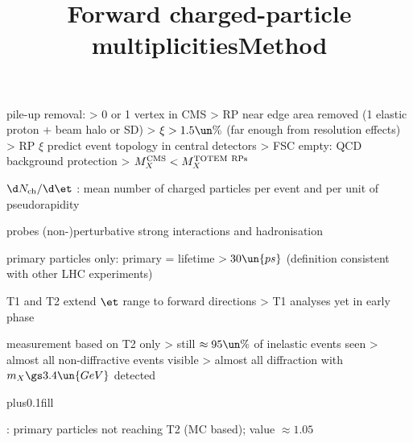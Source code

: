 \vskip-5mm
\> pile-up removal:
\>> 0 or 1 vertex in CMS
\>> RP near edge area removed (1 elastic proton + beam halo or SD)
\>> $\xi > 1.5\un{\%}$ (far enough from resolution effects)
\>> RP $\xi$ predict event topology in central detectors
\>> FSC empty: QCD background protection
\>> $M_X^{\rm CMS} < M_X^{\rm TOTEM\ RPs}$

\newpage %
\hbox{}
\vfill
\title{Forward charged-particle multiplicities}


\vfill
\> $\d N_{\rm ch} / \d\et$ : mean number of charged particles per event and per unit of pseudorapidity

\> probes (non-)perturbative strong interactions and hadronisation 

\> primary particles only: primary = lifetime $> 30\un{ps}$ (definition consistent with other LHC experiments)

\> T1 and T2 extend $\et$ range to forward directions
\>> T1 analyses yet in early phase

\> measurement based on T2 only
\>> still $\approx 95\un{\%}$ of inelastic events seen
\>> almost all non-diffractive events visible
\>> almost all diffraction with $m_X \gs 3.4\un{GeV}$ detected

\vskip0pt plus0.1fill

\newpage %
\title{Method}



\> : primary particles not reaching T2 (MC based); value $\approx 1.05$

